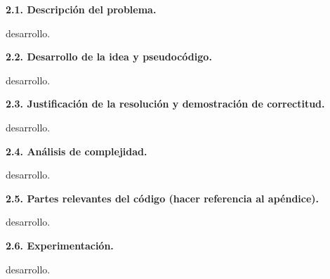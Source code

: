 \noindent
\textbf{2.1. Descripción del problema.}

\vspace*{0.3cm}

desarrollo.

\vspace*{0.75cm} \noindent



\noindent
\textbf{2.2. Desarrollo de la idea y pseudocódigo.}

\vspace*{0.3cm}

desarrollo.


\vspace*{0.75cm} \noindent


\noindent
\textbf{2.3. Justificación de la resolución y demostración de correctitud.}

\vspace*{0.3cm}

desarrollo.


\vspace*{0.75cm} \noindent



\noindent
\textbf{2.4. Análisis de complejidad.}

\vspace*{0.3cm}

desarrollo.


\vspace*{0.75cm} \noindent



\noindent
\textbf{2.5. Partes relevantes del código (hacer referencia al apéndice).}

\vspace*{0.3cm}

desarrollo.


\vspace*{0.75cm} \noindent



\noindent
\textbf{2.6. Experimentación.}

\vspace*{0.3cm}

desarrollo.
